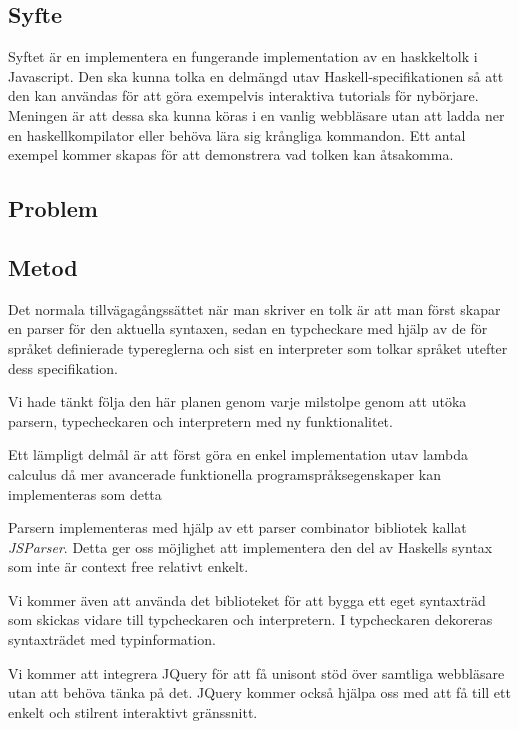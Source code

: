 \subsection{Syfte}
Syftet är en implementera en fungerande implementation av en haskkeltolk i Javascript. Den ska kunna tolka en delmängd utav Haskell-specifikationen så att den kan användas för att göra exempelvis interaktiva tutorials för nybörjare.
Meningen är att dessa ska kunna köras i en vanlig webbläsare utan att ladda ner en haskellkompilator eller behöva lära sig krångliga kommandon.
Ett antal exempel kommer skapas för att demonstrera vad tolken kan åtsakomma. 

\subsection{Problem} 

\subsection{Metod} 
Det normala tillvägagångssättet när man skriver en tolk är att man först
skapar en parser för den aktuella syntaxen, sedan en typcheckare med 
hjälp av de för språket definierade typereglerna och sist en interpreter
som tolkar språket utefter dess specifikation.

Vi hade tänkt följa den här planen genom varje milstolpe genom att utöka parsern, typecheckaren och interpretern med ny funktionalitet.

Ett lämpligt delmål är att först göra en enkel implementation utav lambda calculus då mer avancerade funktionella programspråksegenskaper kan implementeras som detta \citep{jones87}

 Parsern implementeras med hjälp av ett parser combinator bibliotek kallat \emph{JSParser}. Detta ger oss möjlighet att implementera den del av Haskells syntax som inte är context free relativt enkelt.

Vi kommer även att använda det biblioteket för att bygga ett eget syntaxträd som skickas vidare till typcheckaren och interpretern. I typcheckaren dekoreras syntaxträdet med typinformation.

Vi kommer att integrera JQuery för att få unisont stöd över samtliga webbläsare utan att behöva tänka på det. JQuery kommer också hjälpa oss med att få till ett enkelt och stilrent interaktivt gränssnitt.

